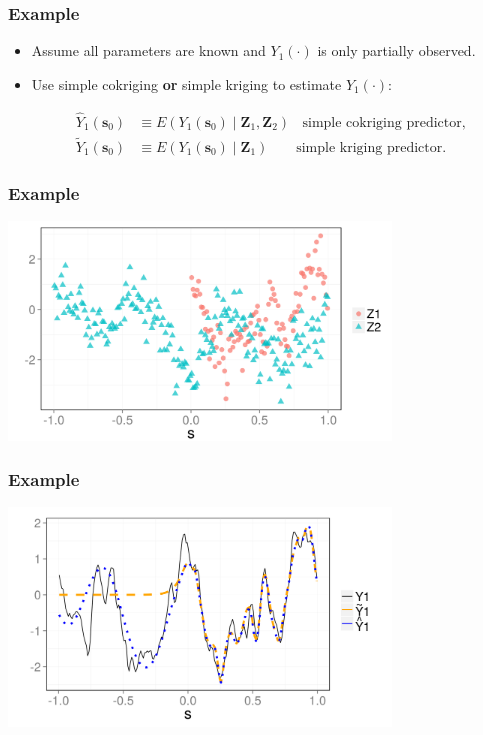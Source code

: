 \documentclass{beamer}
\newcommand{\svec} {\textbf{s}}
\newcommand{\Zvec}{\mathbf{Z}}
\newcommand{\E}{E}
\begin{document}
\begin{frame}
\frametitle{Example}

\begin{itemize}
\item Assume all parameters are known and $Y_1(\cdot)$ is only partially observed. \vfill
\item Use simple cokriging {\bf or} simple kriging to estimate $Y_1(\cdot)$:

\begin{align*}
\hat Y_1(\svec_0) &\equiv \E(Y_1(\svec_0) \mid  \Zvec_1, \Zvec_2)~~~~\textrm{simple cokriging predictor}, \\
\widetilde Y_1(\svec_0) &\equiv \E(Y_1(\svec_0) \mid  \Zvec_1)~~~~~~~~~\textrm{simple kriging predictor}.
\end{align*}\vfill
\end{itemize}

\end{frame}


\begin{frame}
\frametitle{Example}
\begin{center}
\includegraphics[width=4in]{./sim_obs.png}
\end{center}
\end{frame}


\begin{frame}
\frametitle{Example}
\begin{center}
\includegraphics[width=4in]{./sim_est.png}
\end{center}
\end{frame}
\end{document}
